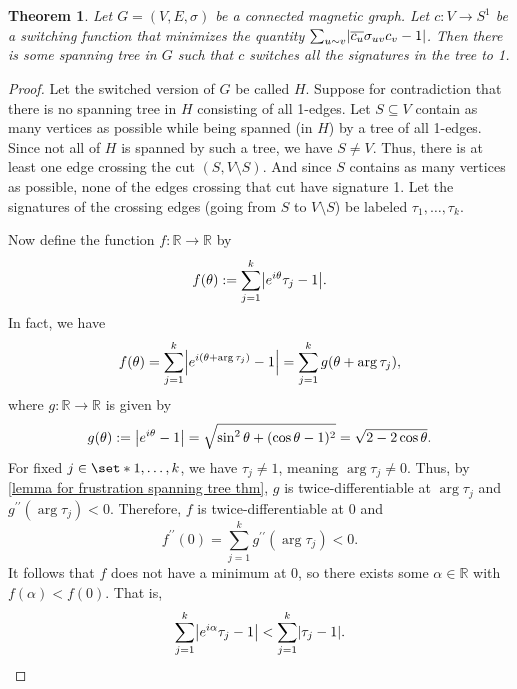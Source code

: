 \documentclass[12pt]{article}
\newtheorem{thm}{Theorem}
\theoremstyle{definition}
\newcommand{\R}{\mathbb R}
\DeclarePairedDelimiter\abs{\lvert}{\rvert}
\begin{document}
\begin{thm}\label{Minimizing frustration reduces spanning tree}
Let $G = (V, E, \sigma)$ be a connected magnetic graph. Let $c:V \rightarrow S^1$ be a switching function that minimizes the quantity $\sum_{u \sim v} 
\abs*{\overline{c_u} \sigma_{uv} c_v - 1}$. Then there is some spanning tree in $G$ such that $c$ switches all the signatures in the tree to 1.
\end{thm}
\begin{proof}
Let the switched version of $G$ be called $H$. Suppose for contradiction that there is no spanning tree in $H$ consisting of all 1-edges. Let $S \subseteq V$ contain as many vertices as possible while being spanned (in $H$) by a tree of all 1-edges. Since not all of $H$ is spanned by such a tree, we have $S \neq V$. Thus, there is at least one edge crossing the cut $(S, V \setminus S)$. And since $S$ contains as many vertices as possible, none of the edges crossing that cut have signature 1. Let the signatures of the crossing edges (going from $S$ to $V \setminus S$) be labeled $\tau_1, \dots, \tau_k$.

Now define the function $f : \R \rightarrow \R$ by $$f(\theta) := \sum_{j=1}^k \abs*{e^{i \theta} \tau_j - 1}.$$ In fact, we have 
$$f(\theta) = \sum_{j=1}^k \abs*{e^{i (\theta + \arg \tau_j)} - 1} = \sum_{j=1}^k g(\theta + \arg \tau_j),$$
where $g : \R \rightarrow \R$ is given by $$g(\theta) := \abs*{e^{i \theta} - 1} = \sqrt{\sin^2{\theta} + (\cos \theta - 1)^2} = \sqrt{2 - 2 \cos \theta}.$$ 
For fixed $j \in \set*{1, \dots, k}$, we have $\tau_j \neq 1$, meaning $\arg \tau_j \neq 0$. Thus, by \cref{lemma for frustration spanning tree thm}, $g$ is twice-differentiable at $\arg \tau_j$ and $g^{\prime \prime}(\arg \tau_j) < 0$. Therefore, $f$ is twice-differentiable at 0 and 
$$
f^{\prime \prime}(0) = \sum_{j=1}^k g^{\prime \prime}(\arg \tau_j) < 0.
$$
It follows that $f$ does not have a minimum at 0, so there exists some $\alpha \in \R$ with $f(\alpha) < f(0)$. That is, 
\begin{equation}\label{eqn:frustration ineq}
\sum_{j=1}^k \abs*{e^{i \alpha} \tau_j - 1} < \sum_{j=1}^k \abs*{\tau_j - 1}.
\end{equation}


\end{proof}
\end{document}
